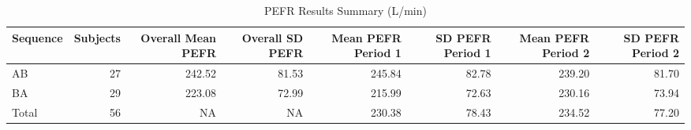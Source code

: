 \begin{table}
\centering
\caption{PEFR Results Summary (L/min)}
\centering
\begin{tabular}[t]{l|r|r|r|r|r|r|r}
\hline
Sequence & Subjects & Overall Mean PEFR & Overall SD PEFR & Mean PEFR Period 1 & SD PEFR Period 1 & Mean PEFR Period 2 & SD PEFR Period 2\\
\hline
AB & 27 & 242.52 & 81.53 & 245.84 & 82.78 & 239.20 & 81.70\\
\hline
BA & 29 & 223.08 & 72.99 & 215.99 & 72.63 & 230.16 & 73.94\\
\hline
Total & 56 & NA & NA & 230.38 & 78.43 & 234.52 & 77.20\\
\hline
\end{tabular}
\end{table}
